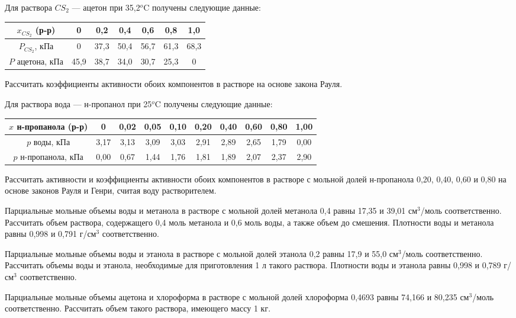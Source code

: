 \begin{Task}
Для раствора $CS_{2}$ --- ацетон при 35,2$^{o}$C получены следующие данные:\\
\begin{tabular}{|c|c|c|c|c|c|c|}
\hline 
$x_{CS_{2}}$ (р-р) & 0 & 0,2 & 0,4 & 0,6 & 0,8 & 1,0\\
\hline 
$P_{CS_{2}}$, кПа & 0 & 37,3 & 50,4 & 56,7 & 61,3 & 68,3\\
\hline 
$P$ ацетона, кПа & 45,9 & 38,7 & 34,0 & 30,7 & 25,3 & 0\\
\hline 
\end{tabular} 

Рассчитать коэффициенты активности обоих компонентов в растворе на основе закона Рауля.
\end{Task}
\begin{Task}
Для раствора вода --- н-пропанол при 25$^{o}$C получены следующие данные:\\
\begin{tabular}{|c|c|c|c|c|c|c|c|c|c|}
\hline 
$x$ н-пропанола (р-р) & 0 & 0,02 & 0,05 & 0,10 & 0,20 & 0,40 & 0,60 & 0,80 & 1,00\\
\hline  
$p$ воды, кПа & 3,17 & 3,13 & 3,09 & 3,03 & 2,91 & 2,89 & 2,65 & 1,79 & 0,00\\ 
\hline 
$p$ н-пропанола, кПа & 0,00 & 0,67 & 1,44 & 1,76 & 1,81 & 1,89 & 2,07 & 2,37 & 2,90\\
\hline 
\end{tabular} 

Рассчитать активности и коэффициенты активности обоих компонентов в растворе с мольной долей н-пропанола 0,20, 0,40, 0,60 и 0,80 на основе законов Рауля и Генри, считая воду растворителем.
\end{Task}
\begin{Task}
Парциальные мольные объемы воды и метанола в растворе с мольной долей метанола 0,4 равны 17,35 и 39,01 см$^{3}$/моль соответственно. Рассчитать объем раствора, содержащего 0,4 моль метанола и 0,6 моль воды, а также объем до смешения. Плотности воды и метанола равны 0,998 и 0,791 г/см$^{3}$ соответственно.
\end{Task}
\begin{Task}
Парциальные мольные объемы воды и этанола в растворе с мольной долей этанола 0,2 равны 17,9 и 55,0 см$^{3}$/моль соответственно. Рассчитать объемы воды и этанола, необходимые для приготовления 1 л такого раствора. Плотности воды и этанола равны 0,998 и 0,789 г/см$^{3}$ соответственно.
\end{Task}
\begin{Task}
Парциальные мольные объемы ацетона и хлороформа в растворе с мольной долей хлороформа 0,4693 равны 74,166 и 80,235 см$^{3}$/моль соответственно. Рассчитать объем такого раствора, имеющего массу 1 кг.
\end{Task}

